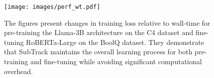 \begin{figure}[h]
    \centering
    \texttt{[image: images/perf\_wt.pdf]}
    \caption{\small{The figures present changes in training loss relative to wall-time for pre-training the Llama-3B architecture on the C4 dataset and fine-tuning RoBERTa-Large on the BoolQ dataset. They demonstrate that SubTrack maintains the overall learning process for both pre-training and fine-tuning while avoiding significant computational overhead.}}
    \label{fig:pert-wt}
\vspace{-3mm}
\end{figure}
